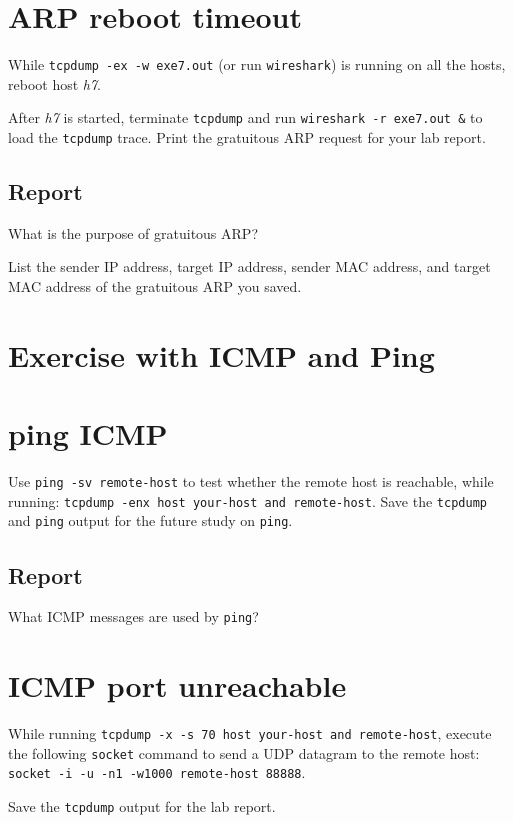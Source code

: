 \documentclass{../UTNetLab}
\begin{document}
\section{ARP reboot timeout}
    While \lstinline{tcpdump -ex -w exe7.out} (or run \lstinline{wireshark}) is running on all the hosts, reboot host \textit{h7}. 

    After \textit{h7} is started, terminate \lstinline{tcpdump} and run \lstinline{wireshark -r exe7.out &} to load the \lstinline{tcpdump} trace.
    Print the gratuitous ARP request for your lab report.
    
    \subsection*{Report}
    What is the purpose of gratuitous ARP?

    List the sender IP address, target IP address, sender MAC address, and target MAC address of the gratuitous ARP you saved.


\section*{Exercise with ICMP and Ping}
\section{ping ICMP}
    Use \lstinline[emph={remote-host}]{ping -sv remote-host} to test whether the remote host is reachable, while running:
    \lstinline[emph={your-host, remote-host}]{tcpdump -enx host your-host and remote-host}.
    Save the \lstinline{tcpdump} and \lstinline{ping} output for the future study on \lstinline{ping}.
    
    \subsection*{Report}
    What ICMP messages are used by \lstinline{ping}?

\section{ICMP port unreachable}
    While running \lstinline[emph={your-host, remote-host}]{tcpdump -x -s 70 host your-host and remote-host}, execute the following \lstinline{socket} command to send a UDP datagram to the remote host:
    \lstinline[emph={your-host, remote-host}]{socket -i -u -n1 -w1000 remote-host 88888}.

    Save the \lstinline{tcpdump} output for the lab report.
\end{document}
